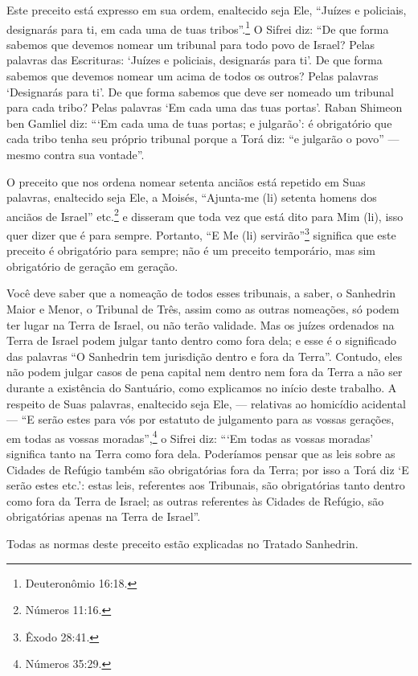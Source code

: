 Este preceito está expresso em sua ordem, enaltecido seja Ele, ``Juízes
e policiais, designarás para ti, em cada uma de tuas tribos''.\footnote{Deuteronômio 16:18.} O Sifrei diz: ``De que forma sabemos que devemos
nomear um tribunal para todo povo de Israel? Pelas palavras das
Escrituras: `Juízes e policiais, designarás para ti'. De que forma
sabemos que devemos nomear um acima de todos os outros? Pelas palavras `Designarás para ti'. De que forma sabemos
que deve ser nomeado um tribunal para cada tribo? Pelas palavras `Em
cada uma das tuas portas'. Raban Shimeon ben Gamliel diz: ```Em cada uma
de tuas portas; e julgarão': é obrigatório que cada tribo tenha seu
próprio tribunal porque a Torá diz: ``e julgarão o povo'' --- mesmo
contra sua vontade''.

O preceito que nos ordena nomear setenta anciãos está repetido em Suas
palavras, enaltecido seja Ele, a Moisés, ``Ajunta-me (li) setenta homens
dos anciãos de Israel'' etc.\footnote{Números 11:16.} e disseram que toda vez
que está dito para Mim (li), isso quer dizer que é para sempre.
Portanto, ``E Me (li) servirão''\footnote{Êxodo 28:41.} significa que este
preceito é obrigatório para sempre; não é um preceito temporário, mas
sim obrigatório de geração em geração.

Você deve saber que a nomeação de todos esses tribunais, a saber, o
Sanhedrin Maior e Menor, o Tribunal de Três, assim como as outras
nomeações, só podem ter lugar na Terra de Israel, ou não terão
validade. Mas os juízes ordenados na Terra de Israel podem julgar tanto
dentro como fora dela; e esse é o significado das palavras ``O Sanhedrin
tem jurisdição dentro e fora da Terra''. Contudo, eles não podem julgar
casos de pena capital nem dentro nem fora da Terra a não ser durante a
existência do Santuário, como explicamos no início deste trabalho. A
respeito de Suas palavras, enaltecido seja Ele, --- relativas ao
homicídio acidental --- ``E serão estes para vós por estatuto de
julgamento para as vossas gerações, em todas as vossas moradas'',\footnote{Números 35:29.} o Sifrei diz: ```Em todas as vossas moradas' significa
tanto na Terra como fora dela. Poderíamos pensar que as leis sobre as
Cidades de Refúgio também são obrigatórias fora da Terra; por isso a
Torá diz `E serão estes etc.': estas leis, referentes aos Tribunais,
são obrigatórias tanto dentro como fora da Terra de Israel; as outras
referentes às Cidades de Refúgio, são obrigatórias apenas na Terra de
Israel''.

Todas as normas deste preceito estão explicadas no Tratado Sanhedrin.

